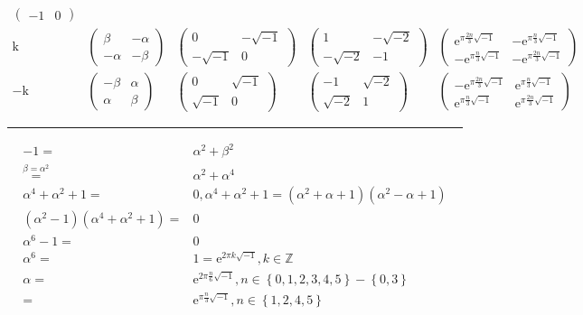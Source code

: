 \documentclass[
]{book}
\theoremstyle{definition}
\theoremstyle{definition}
\theoremstyle{definition}
\theoremstyle{definition}
\theoremstyle{remark}
\begin{document}
\[\begin{array}{ccccc}
\begin{pmatrix}
-1 & 0
\end{pmatrix}\\
\mathrm{k} & \begin{pmatrix}\beta & -\alpha\\
-\alpha & -\beta
\end{pmatrix} & \begin{pmatrix}0 & -\sqrt{-1}\\
-\sqrt{-1} & 0
\end{pmatrix} & \begin{pmatrix}1 & -\sqrt{-2}\\
-\sqrt{-2} & -1
\end{pmatrix} & \begin{pmatrix}\mathrm{e}^{\pi\frac{2n}{3}\sqrt{-1}} & -\mathrm{e}^{\pi\frac{n}{3}\sqrt{-1}}\\
-\mathrm{e}^{\pi\frac{n}{3}\sqrt{-1}} & -\mathrm{e}^{\pi\frac{2n}{3}\sqrt{-1}}
\end{pmatrix}\\
-\mathrm{k} & \begin{pmatrix}-\beta & \alpha\\
\alpha & \beta
\end{pmatrix} & \begin{pmatrix}0 & \sqrt{-1}\\
\sqrt{-1} & 0
\end{pmatrix} & \begin{pmatrix}-1 & \sqrt{-2}\\
\sqrt{-2} & 1
\end{pmatrix} & \begin{pmatrix}-\mathrm{e}^{\pi\frac{2n}{3}\sqrt{-1}} & \mathrm{e}^{\pi\frac{n}{3}\sqrt{-1}}\\
\mathrm{e}^{\pi\frac{n}{3}\sqrt{-1}} & \mathrm{e}^{\pi\frac{2n}{3}\sqrt{-1}}
\end{pmatrix}
\end{array}
\]

\begin{center}\rule{0.5\linewidth}{0.5pt}\end{center}

\[
\begin{aligned}
-1= & \alpha^{2}+\beta^{2}\\
\overset{\beta=\alpha^{2}}{=} & \alpha^{2}+\alpha^{4}\\
\alpha^{4}+\alpha^{2}+1= & 0,\alpha^{4}+\alpha^{2}+1=\left(\alpha^{2}+\alpha+1\right)\left(\alpha^{2}-\alpha+1\right)\\
\left(\alpha^{2}-1\right)\left(\alpha^{4}+\alpha^{2}+1\right)= & 0\\
\alpha^{6}-1= & 0\\
\alpha^{6}= & 1=\mathrm{e}^{2\pi k\sqrt{-1}},k\in\mathbb{Z}\\
\alpha= & \mathrm{e}^{2\pi\frac{n}{6}\sqrt{-1}},n\in\left\{ 0,1,2,3,4,5\right\} -\left\{ 0,3\right\} \\
= & \mathrm{e}^{\pi\frac{n}{3}\sqrt{-1}},n\in\left\{ 1,2,4,5\right\} 
\end{aligned}
\]
\end{document}

